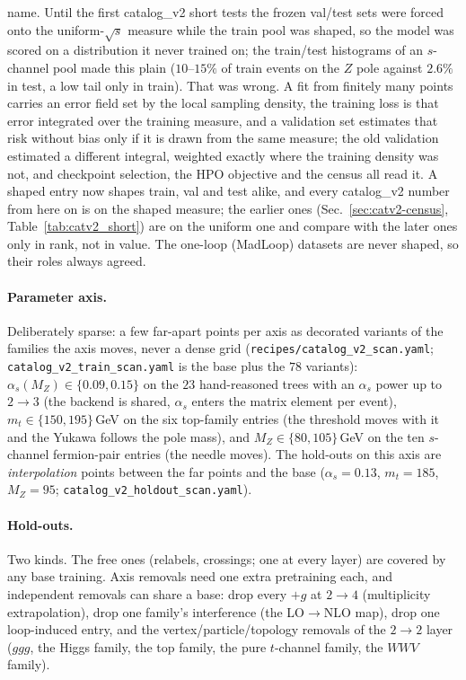 \documentclass[11pt]{article}
\newcommand{\code}[1]{\texttt{#1}}
\begin{document}
name. Until the first catalog\_v2 short tests the frozen val/test sets were forced onto the
uniform-$\sqrt s$ measure while the train pool was shaped, so the model was scored on a
distribution it never trained on; the train/test histograms of an $s$-channel pool made this
plain ($10$--$15\%$ of train events on the $Z$ pole against $2.6\%$ in test, a low tail only
in train). That was wrong. A fit from finitely many points carries an error field set by the
local sampling density, the training loss is that error integrated over the training measure,
and a validation set estimates that risk without bias only if it is drawn from the same
measure; the old validation estimated a different integral, weighted exactly where the
training density was not, and checkpoint selection, the HPO objective and the census all read
it. A shaped entry now shapes train, val and test alike, and every catalog\_v2 number from
here on is on the shaped measure; the earlier ones (Sec.~\ref{sec:catv2-census},
Table~\ref{tab:catv2_short}) are on the uniform one and compare with the later ones only in rank, not in value. The
one-loop (MadLoop) datasets are never shaped, so their roles always agreed.

\paragraph{Parameter axis.} Deliberately sparse: a few far-apart points per axis as decorated
variants of the families the axis moves, never a dense grid (\code{recipes/catalog\_v2\_scan.yaml};
\code{catalog\_v2\_train\_scan.yaml} is the base plus the $78$ variants): $\alpha_s(M_Z)\in\{0.09,
0.15\}$ on the $23$ hand-reasoned trees with an $\alpha_s$ power up to $2\to3$ (the backend is
shared, $\alpha_s$ enters the matrix element per event), $m_t\in\{150,195\}$\,GeV on the six
top-family entries (the threshold moves with it and the Yukawa follows the pole mass), and
$M_Z\in\{80,105\}$\,GeV on the ten $s$-channel fermion-pair entries (the needle moves). The
hold-outs on this axis are \emph{interpolation} points between the far points and the base
($\alpha_s=0.13$, $m_t=185$, $M_Z=95$; \code{catalog\_v2\_holdout\_scan.yaml}).

\paragraph{Hold-outs.} Two kinds. The free ones (relabels, crossings; one at every layer) are
covered by any base training. Axis removals need one extra pretraining each, and independent
removals can share a base: drop every $+g$ at $2\to4$ (multiplicity extrapolation), drop one
family's interference (the LO$\to$NLO map), drop one loop-induced entry, and the
vertex/particle/topology removals of the $2\to2$ layer ($ggg$, the Higgs family, the top
family, the pure $t$-channel family, the $WWV$ family).
\end{document}
